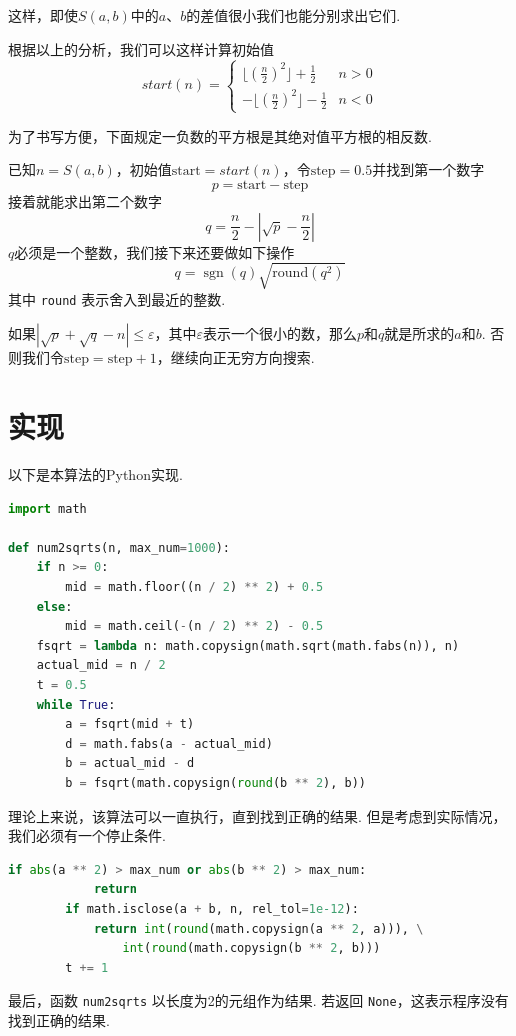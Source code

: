 \documentclass[a4paper, UTF8]{ctexart}
\DeclareMathOperator{\sgn}{\mathrm{sgn}}
\begin{document}
这样，即使$S(a,b)$中的$a$、$b$的差值很小我们也能分别求出它们.

根据以上的分析，我们可以这样计算初始值
\[
    start(n)=
    \begin{cases}
        \lfloor(\frac{n}{2})^2\rfloor+\frac{1}{2}  &n>0 \\
        -\lfloor(\frac{n}{2})^2\rfloor-\frac{1}{2} &n<0
    \end{cases}
\]

为了书写方便，下面规定一负数的平方根是其绝对值平方根的相反数.

已知$n=S(a,b)$，初始值$\text{start}=start(n)$，令$\text{step}=0.5$并找到第一个数字\[p=\text{start}-\text{step}\]接着就能求出第二个数字\[q=\frac{n}{2}-|\sqrt{p}-\frac{n}{2}|\]$q$必须是一个整数，我们接下来还要做如下操作\[q=\sgn(q)\sqrt{\mathrm{round}(q^2)}\]其中 \verb|round| 表示舍入到最近的整数.

如果$|\sqrt{p}+\sqrt{q}-n|\leq\varepsilon$，其中$\varepsilon$表示一个很小的数，那么$p$和$q$就是所求的$a$和$b$. 否则我们令$\text{step}=\text{step}+1$，继续向正无穷方向搜索.

\section{实现}
以下是本算法的Python实现.

\begin{lstlisting}[language=python, name=example1]
import math

def num2sqrts(n, max_num=1000):
    if n >= 0:
        mid = math.floor((n / 2) ** 2) + 0.5
    else:
        mid = math.ceil(-(n / 2) ** 2) - 0.5
    fsqrt = lambda n: math.copysign(math.sqrt(math.fabs(n)), n)
    actual_mid = n / 2
    t = 0.5
    while True:
        a = fsqrt(mid + t)
        d = math.fabs(a - actual_mid)
        b = actual_mid - d
        b = fsqrt(math.copysign(round(b ** 2), b))
\end{lstlisting}
理论上来说，该算法可以一直执行，直到找到正确的结果. 但是考虑到实际情况，我们必须有一个停止条件.
\begin{lstlisting}[language=python, name=example1]
        if abs(a ** 2) > max_num or abs(b ** 2) > max_num:
            return
        if math.isclose(a + b, n, rel_tol=1e-12):
            return int(round(math.copysign(a ** 2, a))), \
                int(round(math.copysign(b ** 2, b)))
        t += 1
\end{lstlisting}
最后，函数 \verb|num2sqrts| 以长度为2的元组作为结果. 若返回 \verb|None|，这表示程序没有找到正确的结果.
\end{document}

